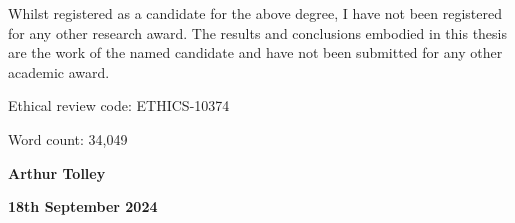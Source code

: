 Whilst registered as a candidate for the above degree, I have not been registered for any other research award. The results and conclusions embodied in this thesis are the work of the named candidate and have not been submitted for any other academic award.

\vspace{\baselineskip}
\noindent Ethical review code: ETHICS-10374

\vspace{\baselineskip}
\noindent Word count: 34,049

\noindent\hrulefill

\vspace{\baselineskip}
\noindent \textbf{Arthur Tolley}

\noindent \textbf{18th September 2024}
